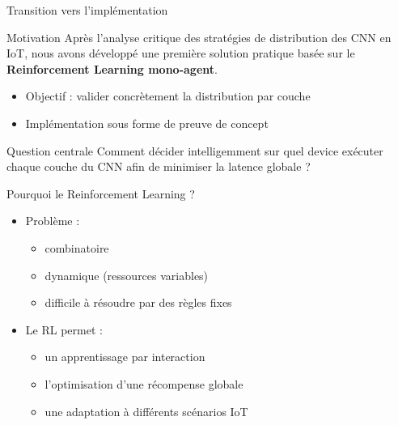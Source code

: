 \documentclass[aspectratio=169]{beamer}
\begin{document}
\begin{frame}{Transition vers l’implémentation}

\begin{block}{Motivation}
Après l’analyse critique des stratégies de distribution des CNN en IoT,
nous avons développé une première solution pratique basée sur
le \textbf{Reinforcement Learning mono-agent}.
\end{block}

\vspace{0.2cm}
\begin{itemize}
    \item Objectif : valider concrètement la distribution par couche
    \item Implémentation sous forme de preuve de concept
\end{itemize}

\vspace{0.2cm}
\begin{block}{Question centrale}
Comment décider intelligemment sur quel device exécuter
chaque couche du CNN afin de minimiser la latence globale ?
\end{block}

\end{frame}

\begin{frame}{Pourquoi le Reinforcement Learning ?}

\begin{itemize}
    \item Problème :
    \begin{itemize}
        \item combinatoire
        \item dynamique (ressources variables)
        \item difficile à résoudre par des règles fixes
    \end{itemize}
    
    \vspace{0.2cm}
    \item Le RL permet :
    \begin{itemize}
        \item un apprentissage par interaction
        \item l’optimisation d’une récompense globale
        \item une adaptation à différents scénarios IoT
    \end{itemize}
\end{itemize}

\end{frame}
\end{document}
